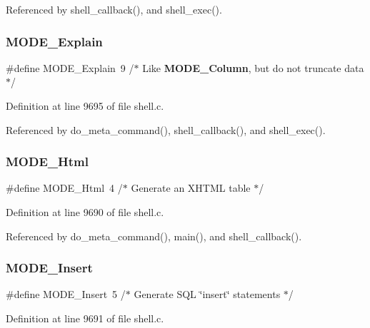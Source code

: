 Referenced by shell\+\_\+callback(), and shell\+\_\+exec().

\mbox{\label{shell_8c_a19ccb86edba8b6a7fb4b37c2c8d79e56}} 
\subsubsection{M\+O\+D\+E\+\_\+\+Explain}
{\footnotesize\ttfamily \#define M\+O\+D\+E\+\_\+\+Explain~9  /$\ast$ Like \textbf{ M\+O\+D\+E\+\_\+\+Column}, but do not truncate data $\ast$/}



Definition at line 9695 of file shell.\+c.



Referenced by do\+\_\+meta\+\_\+command(), shell\+\_\+callback(), and shell\+\_\+exec().

\mbox{\label{shell_8c_a29ff864d82f3ff664b5431cd6b976d8f}} 
\subsubsection{M\+O\+D\+E\+\_\+\+Html}
{\footnotesize\ttfamily \#define M\+O\+D\+E\+\_\+\+Html~4  /$\ast$ Generate an X\+H\+T\+ML table $\ast$/}



Definition at line 9690 of file shell.\+c.



Referenced by do\+\_\+meta\+\_\+command(), main(), and shell\+\_\+callback().

\mbox{\label{shell_8c_a3d8396db61d71ae98f659d572c71b14e}} 
\subsubsection{M\+O\+D\+E\+\_\+\+Insert}
{\footnotesize\ttfamily \#define M\+O\+D\+E\+\_\+\+Insert~5  /$\ast$ Generate S\+QL \char`\"{}insert\char`\"{} statements $\ast$/}



Definition at line 9691 of file shell.\+c.



